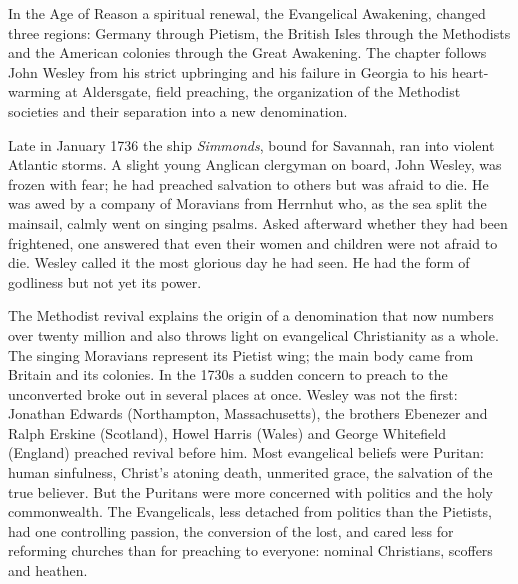
\begin{inbrief}
In the Age of Reason a spiritual renewal, the Evangelical Awakening, changed three regions: Germany
through Pietism, the British Isles through the Methodists and the American colonies through the Great
Awakening. The chapter follows John Wesley from his strict upbringing and his failure in Georgia to
his heart-warming at Aldersgate, field preaching, the organization of the Methodist societies and
their separation into a new denomination.
\end{inbrief}

Late in January 1736 the ship \emph{Simmonds}, bound for Savannah, ran into violent Atlantic storms.
A slight young Anglican clergyman on board, John Wesley, was frozen with fear; he had preached
salvation to others but was afraid to die. He was awed by a company of Moravians from Herrnhut who,
as the sea split the mainsail, calmly went on singing psalms. Asked afterward whether they had been
frightened, one answered that even their women and children were not afraid to die. Wesley called it
the most glorious day he had seen. He had the form of godliness but not yet its power.

The Methodist revival explains the origin of a denomination that now numbers over twenty million and
also throws light on evangelical Christianity as a whole. The singing Moravians represent its Pietist
wing; the main body came from Britain and its colonies. In the 1730s a sudden concern to preach to
the unconverted broke out in several places at once. Wesley was not the first: Jonathan Edwards (Northampton, Massachusetts), the brothers Ebenezer and Ralph Erskine (Scotland), Howel Harris (Wales) and George Whitefield (England) preached revival before him. Most evangelical beliefs were Puritan: human sinfulness, Christ's atoning death,
unmerited grace, the salvation of the true believer. But the Puritans were more concerned with
politics and the holy commonwealth. The Evangelicals, less detached from politics than the Pietists,
had one controlling passion, the conversion of the lost, and cared less for reforming churches than
for preaching to everyone: nominal Christians, scoffers and heathen.

